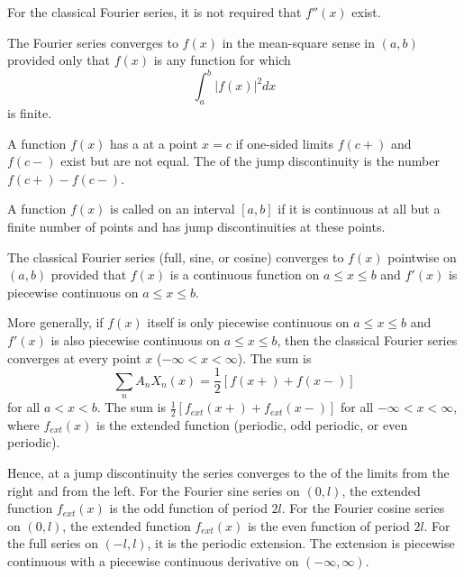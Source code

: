 \documentclass[12pt, a4paper, oneside, openright, titlepage]{book}
\begin{document}
For the classical Fourier series, it is not required that $f''(x)$ exist.

\begin{thm}
    The Fourier series converges to $f(x)$ in the mean-square sense in $(a,b)$ provided only that $f(x)$ is any function for which \begin{equation*}
        \int_a^b|f(x)|^2dx
    \end{equation*}
    is finite.
\end{thm}

\begin{defn}
    A function $f(x)$ has a  at a point $x =c$ if one-sided limits $f(c+)$ and $f(c-)$ exist but are not equal. The  of the jump discontinuity is the number $f(c+) - f(c-)$.
\end{defn}

\begin{defn}
    A function $f(x)$ is called  on an interval $[a,b]$ if it is continuous at all but a finite number of points and has jump discontinuities at these points.
\end{defn}

\begin{thm}
    The classical Fourier series (full, sine, or cosine) converges to $f(x)$ pointwise on $(a,b)$ provided that $f(x)$ is a continuous function on $a \leq x \leq b$ and $f'(x)$ is piecewise continuous on $a \leq x \leq b$.


    More generally, if $f(x)$ itself is only piecewise continuous on $a \leq x \leq b$ and $f'(x)$ is also piecewise continuous on $a \leq x \leq b$, then the classical Fourier series converges at every point $x$ ($-\infty < x < \infty$). The sum is \begin{equation*}
        \sum_nA_nX_n(x) = \frac{1}{2}[f(x+)+f(x-)]
    \end{equation*}
    for all $a < x < b$. The sum is $\frac{1}{2}[f_{ext}(x+)+f_{ext}(x-)]$ for all $-\infty < x < \infty$, where $f_{ext}(x)$ is the extended function (periodic, odd periodic, or even periodic).
\end{thm}

Hence, at a jump discontinuity the series converges to the  of the limits from the right and from the left. For the Fourier sine series on $(0,l)$, the extended function $f_{ext}(x)$ is the odd function of period $2l$. For the Fourier cosine series on $(0,l)$, the extended function $f_{ext}(x)$ is the even function of period $2l$. For the full series on $(-l,l)$, it is the periodic extension. The extension is piecewise continuous with a piecewise continuous derivative on $(-\infty, \infty)$.
\end{document}
